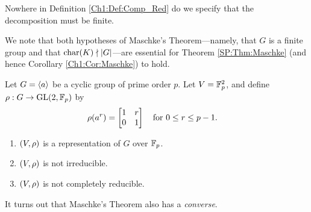 \begin{remark}
    Nowhere in Definition \ref{Ch1:Def:Comp_Red} do we specify that the decomposition must be finite.
\end{remark}

We note that both hypotheses of Maschke's Theorem---namely, that $G$ is a finite group and that $\operatorname{char}\!\left( K \right) \nmid \left\lvert G \right\rvert$---are essential for Theorem \ref{SP:Thm:Maschke} (and hence Corollary \ref{Ch1:Cor:Maschke}) to hold.

\begin{boxnexample}
    Let $G = \left\langle a \right\rangle$ be a cyclic group of prime order $p$. Let $V = \mathbb{F}_p^2$, and define $\rho : G \to \operatorname{GL}\!\left( 2,\mathbb{F}_p \right)$ by
    \begin{align*}
        \rho\!\left( a^r \right) &= \begin{bmatrix}
            1 & r \\ 0 & 1
        \end{bmatrix}
        \quad \text{for $0 \leq r \leq p - 1$.}
    \end{align*}
    \begin{enumerate}
        \item $\left( V, \rho \right)$ is a representation of $G$ over $\mathbb{F}_p$.
        \item $\left( V, \rho \right)$ is not irreducible.
        \item $\left( V, \rho \right)$ is not completely reducible.
    \end{enumerate}
\end{boxnexample}

It turns out that Maschke's Theorem also has a \textit{converse}.


